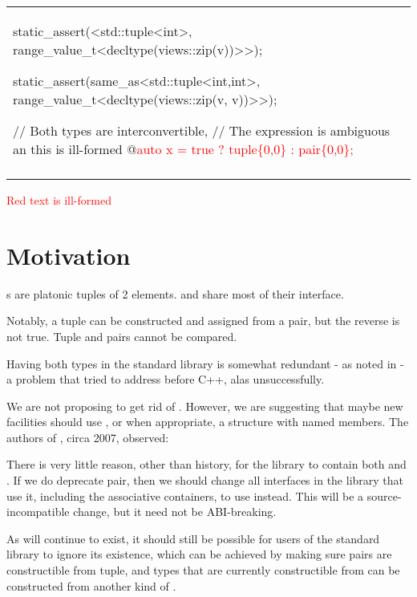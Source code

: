 \documentclass{wg21}
\begin{document}
\begin{center}
\begin{tabular}{l|l}
\begin{minipage}[t]{0.5\textwidth}
\begin{colorblock}
static_assert(<std::tuple<int>,
    range_value_t<decltype(views::zip(v))>>);

static_assert(same_as<std::tuple<int,int>,
    range_value_t<decltype(views::zip(v, v))>>);
    
    
    
    
// Both types are interconvertible,
// The expression is ambiguous an this is ill-formed
@\textcolor{red}{auto x = true ?  tuple\{0,0\} : pair\{0,0\};} 

\end{colorblock}
\end{minipage}
\\\\ \hline

\end{tabular}
\end{center}

\textcolor{red}{Red text is ill-formed}

\section{Motivation}

s are platonic tuples of 2 elements.  and  share
most of their interface.

Notably, a tuple can be constructed and assigned from a pair, but the reverse is not true.
Tuple and pairs cannot be compared.

Having both types in the standard library is somewhat redundant - as noted in  - a problem that 
tried to address before C++, alas unsuccessfully.

We are not proposing to get rid of .
However, we are suggesting that maybe new facilities should use , or when appropriate, a structure with named members.
The authors of , circa 2007, observed:

\begin{quoteblock}
There is very little reason, other than history, for the library to contain both  and . If we do deprecate pair, then we should change all interfaces in the library that use it, including the associative containers, to use  instead. This will be a source-incompatible change, but it need not be ABI-breaking.
\end{quoteblock}

As  will continue to exist, it should still be possible for users of the standard library to ignore its existence, which can be achieved by making sure pairs are constructible from tuple, and types that are currently constructible from  can be constructed from another kind of .
\end{document}
